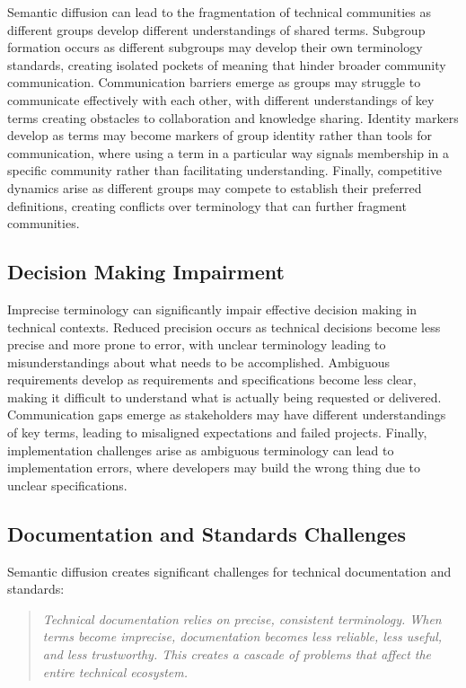 \documentclass[11pt]{article}
\begin{document}
Semantic diffusion can lead to the fragmentation of technical communities as different groups develop different understandings of shared terms. Subgroup formation occurs as different subgroups may develop their own terminology standards, creating isolated pockets of meaning that hinder broader community communication. Communication barriers emerge as groups may struggle to communicate effectively with each other, with different understandings of key terms creating obstacles to collaboration and knowledge sharing. Identity markers develop as terms may become markers of group identity rather than tools for communication, where using a term in a particular way signals membership in a specific community rather than facilitating understanding. Finally, competitive dynamics arise as different groups may compete to establish their preferred definitions, creating conflicts over terminology that can further fragment communities.

\subsection{Decision Making Impairment}

Imprecise terminology can significantly impair effective decision making in technical contexts. Reduced precision occurs as technical decisions become less precise and more prone to error, with unclear terminology leading to misunderstandings about what needs to be accomplished. Ambiguous requirements develop as requirements and specifications become less clear, making it difficult to understand what is actually being requested or delivered. Communication gaps emerge as stakeholders may have different understandings of key terms, leading to misaligned expectations and failed projects. Finally, implementation challenges arise as ambiguous terminology can lead to implementation errors, where developers may build the wrong thing due to unclear specifications.

\subsection{Documentation and Standards Challenges}

Semantic diffusion creates significant challenges for technical documentation and standards:

\begin{quote}
\emph{Technical documentation relies on precise, consistent terminology. When terms become imprecise, documentation becomes less reliable, less useful, and less trustworthy. This creates a cascade of problems that affect the entire technical ecosystem.}
\end{quote}
\end{document}
